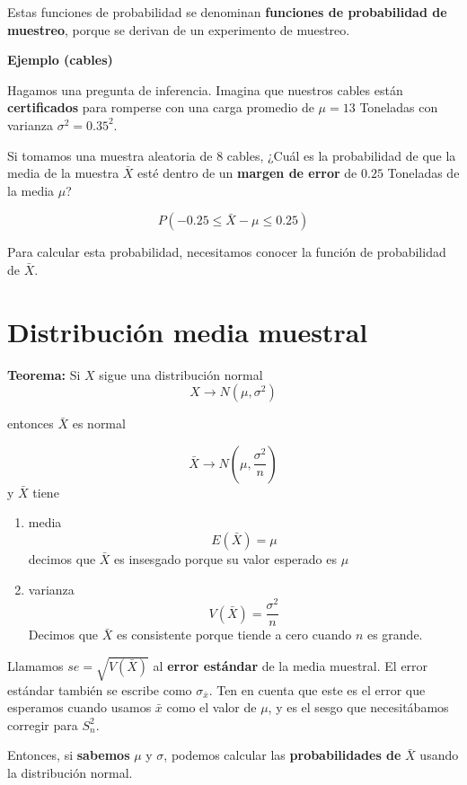 \documentclass[
]{book}
\begin{document}
Estas funciones de probabilidad se denominan \textbf{funciones de probabilidad de muestreo}, porque se derivan de un experimento de muestreo.

\textbf{Ejemplo (cables)}

Hagamos una pregunta de inferencia. Imagina que nuestros cables están \textbf{certificados} para romperse con una carga promedio de \(\mu = 13\) Toneladas con varianza \(\sigma^2=0.35^2\).

Si tomamos una muestra aleatoria de \(8\) cables, ¿Cuál es la probabilidad de que la media de la muestra \(\bar{X}\) esté dentro de un \textbf{margen de error} de \(0.25\) Toneladas de la media \(\mu\)?

\[P(- 0.25\leq \bar{X}-\mu \leq 0.25)\]

Para calcular esta probabilidad, necesitamos conocer la función de probabilidad de \(\bar{X}\).

\hypertarget{distribuciuxf3n-media-muestral}{%
\section{Distribución media muestral}\label{distribuciuxf3n-media-muestral}}

\textbf{Teorema:} Si \(X\) sigue una distribución normal \[X \rightarrow N(\mu, \sigma^2)\]

entonces \(\bar{X}\) es normal

\[\bar{X} \rightarrow N(\mu, \frac{\sigma^2}{n})\]
y \(\bar{X}\) tiene

\begin{enumerate}
\def\labelenumi{\arabic{enumi})}
\item
  media
  \[E(\bar{X})=\mu\]
  decimos que \(\bar{X}\) es insesgado porque su valor esperado es \(\mu\)
\item
  varianza
  \[V(\bar{X})=\frac{\sigma^2}{n}\]
  Decimos que \(\bar{X}\) es consistente porque tiende a cero cuando \(n\) es grande.
\end{enumerate}

Llamamos \(se=\sqrt{V(\bar{X})}\) al \textbf{error estándar} de la media muestral. El error estándar también se escribe como \(\sigma_{\bar{x}}\). Ten en cuenta que este es el error que esperamos cuando usamos \(\bar{x}\) como el valor de \(\mu\), y es el sesgo que necesitábamos corregir para \(S_n^2\).

Entonces, si \textbf{sabemos} \(\mu\) y \(\sigma\), podemos calcular las \textbf{probabilidades de} \(\bar{X}\) usando la distribución normal.
\end{document}
